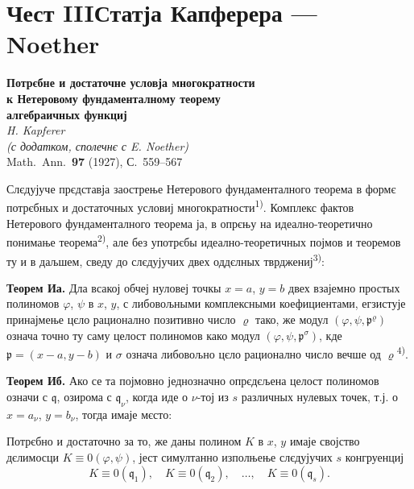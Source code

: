 \documentclass[11pt]{article}
\newcommand{\foreign}[1]{#1}
\theoremstyle{plain}
\begin{document}
\newpage
\part*{Чест III\hspace{1em}Статја Капферера --- Noether}

\begin{center}
\Large\textbf{Потрєбне и достаточне условја многократности}\\[0.3em]
\Large\textbf{к Нетеровому фундаменталному теорему}\\[0.5em]
\large\textbf{алгебраичных функциј}\\[1em]
\normalsize\textit{H. Kapferer}\\[0.5em]
\small\textit{(с додатком, сполечнє с E. Noether)}\\[1em]
\normalsize \foreign{Math.\ Ann.}\ \textbf{97} (1927), С.~559--567
\end{center}

\vspace{1em}

Слєдујуче прєдставја заострење Нетерового фундаменталного
теорема в формє потрєбных и достаточных условиј
многократности\textsuperscript{1)}. Комплекс фактов Нетерового
фундаменталного теорема ја, в опрєњу на идеално-теоретично
понимање теорема\textsuperscript{2)}, але без употрєбы
идеално-теоретичных појмов и теоремов ту и в даљшем, сведу до
слєдујучих двех оддєлных тврджениј\textsuperscript{3)}:

\smallskip
\textbf{Теорем Иа.} Дла всакој обчеј нуловеј точкы $x = a$,
$y = b$ двех взајемно простых полиномов $\varphi$, $\psi$ в $x$, $y$,
с либовољными комплексными коефициентами, егзистује принајмење цєло
рационално позитивно число $\varrho$ тако, же модул
$(\varphi, \psi, \mathfrak{p}^{\varrho})$ означа точно ту саму
целост полиномов како модул $(\varphi, \psi, \mathfrak{p}^{\sigma})$,
кде $\mathfrak{p} = (x-a, y-b)$ и $\sigma$ означа либовољно цєло
рационално число вечше од $\varrho$\textsuperscript{4)}.

\smallskip
\textbf{Теорем Иб.} Ако се та појмовно једнозначно опрєдєљена
целост полиномов означи с $\mathfrak{q}$, озирома с
$\mathfrak{q}_{\nu}$, когда иде о $\nu$-тој из $s$ различных нулевых
точек, т.ј. о $x = a_{\nu}$, $y = b_{\nu}$, тогда имаје мєсто:

Потрєбно и достаточно за то, же даны полином $K$ в $x$, $y$ имаје
својство дєлимосци $K \equiv 0(\varphi, \psi)$, јест симултанно
изполњење слєдујучих $s$ конгруенциј
\[
K \equiv 0(\mathfrak{q}_{1}), \quad K \equiv 0(\mathfrak{q}_{2}), \quad\ldots,\quad
K \equiv 0(\mathfrak{q}_{s}).
\]
\end{document}
